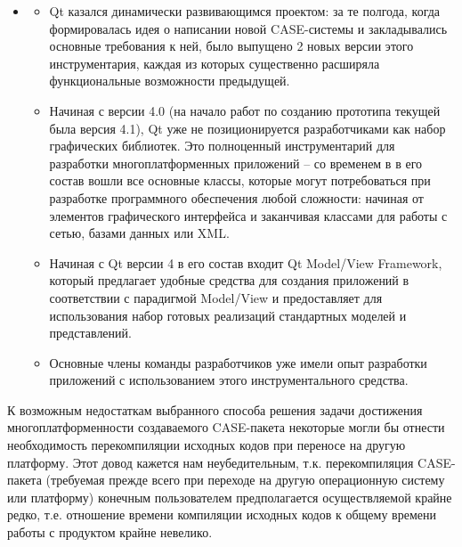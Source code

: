 \documentclass[a4paper]{article}
\newcommand\liststyleWWviiiNumxiv{%
\renewcommand\labelitemi{o}
\renewcommand\labelitemii{[F0B7?]}
\renewcommand\labelitemiii{[F0A7?]}
\renewcommand\labelitemiv{[F0B7?]}
}
\begin{document}
\liststyleWWviiiNumxiv
\begin{itemize}
\item \begin{itemize}
\item {
\foreignlanguage{english}{Qt} казался динамически развивающимся
проектом: за те полгода, когда формировалась идея о написании новой
\foreignlanguage{english}{CASE}{}-системы и закладывались основные
требования к ней, было выпущено 2 новых версии этого инструментария,
каждая из которых существенно расширяла функциональные возможности
предыдущей. }
\item {
Начиная с версии 4.0 (на начало работ по созданию прототипа текущей была
версия 4.1), \foreignlanguage{english}{Qt} уже не позиционируется
разработчиками как набор графических библиотек. Это полноценный
инструментарий для разработки многоплатформенных приложений – со
временем в в его состав вошли все основные классы, которые могут
потребоваться при разработке программного обеспечения любой сложности:
начиная от элементов графического интерфейса и заканчивая классами для
работы с сетью, базами данных или XML.}
\item {
Начиная с \foreignlanguage{english}{Qt} версии 4 в его состав входит
\foreignlanguage{english}{Qt}
\foreignlanguage{english}{Model}/\foreignlanguage{english}{View}
\foreignlanguage{english}{Framework}, который предлагает удобные
средства для создания приложений в соответствии с парадигмой
\foreignlanguage{english}{Model}/\foreignlanguage{english}{View} и
предоставляет для использования набор готовых реализаций стандартных
моделей и представлений.}
\item {
Основные члены команды разработчиков уже имели опыт разработки
приложений с использованием этого инструментального средства.}
\end{itemize}
\end{itemize}
{
К возможным недостаткам выбранного способа решения задачи достижения
многоплатформенности создаваемого
\foreignlanguage{english}{CASE}{}-пакета некоторые могли бы отнести
необходимость перекомпиляции исходных кодов при переносе на другую
платформу. Этот довод кажется нам неубедительным, т.к. перекомпиляция
\foreignlanguage{english}{CASE}{}-пакета (требуемая прежде всего при
переходе на другую операционную систему или платформу) конечным
пользователем предполагается осуществляемой крайне редко, т.е.
отношение времени компиляции исходных кодов к общему времени работы с
продуктом крайне невелико. }
\end{document}
